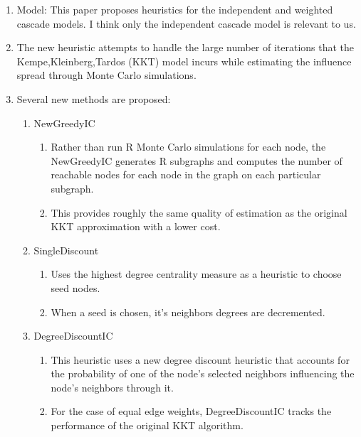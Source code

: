 \documentclass[11pt]{article}
\begin{document}
\begin{enumerate}
    \item Model: This paper proposes heuristics for the independent and weighted cascade models. I think only the independent cascade model is relevant to us.
    \item The new heuristic attempts to handle the large number of iterations that the Kempe,Kleinberg,Tardos (KKT) model incurs while estimating the influence spread through Monte Carlo simulations.
    \item Several new methods are proposed: \begin{enumerate}
        \item NewGreedyIC \begin{enumerate}
            \item Rather than run R Monte Carlo simulations for each node, the NewGreedyIC generates R subgraphs and computes the number of reachable nodes for each node in the graph on each particular subgraph.
            \item This provides roughly the same quality of estimation as the original KKT approximation with a lower cost.
        \end{enumerate}
        \item SingleDiscount \begin{enumerate}
            \item Uses the highest degree centrality measure as a heuristic to choose seed nodes.
            \item When a seed is chosen, it's neighbors degrees are decremented.
        \end{enumerate}
        \item DegreeDiscountIC \begin{enumerate}
            \item This heuristic uses a new degree discount heuristic that accounts for the probability of one of the node's selected neighbors influencing the node's neighbors through it.
            \item For the case of equal edge weights, DegreeDiscountIC tracks the performance of the original KKT algorithm.
        \end{enumerate}
    \end{enumerate}
\end{enumerate}
\end{document}

